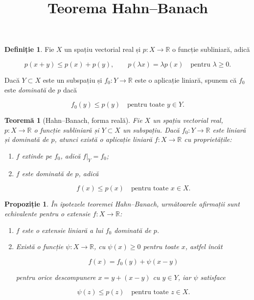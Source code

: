 \documentclass[12pt]{article}
\title{Teorema Hahn--Banach}
\author{}
\date{}
\theoremstyle{definition}
\newtheorem{definition}{Definiție}
\theoremstyle{plain}
\newtheorem{proposition}{Propoziție}
\newtheorem{theorem}{Teoremă}
\begin{document}
\maketitle

\begin{definition}
Fie $X$ un spațiu vectorial real și $p : X \to \mathbb{R}$ o funcție subliniară, adică


\[
p(x+y) \le p(x) + p(y), \qquad p(\lambda x) = \lambda p(x) \quad \text{pentru } \lambda \ge 0.
\]


Dacă $Y \subset X$ este un subspațiu și $f_0 : Y \to \mathbb{R}$ este o aplicație liniară, spunem că $f_0$ este \emph{dominată} de $p$ dacă


\[
f_0(y) \le p(y) \quad \text{pentru toate } y \in Y.
\]


\end{definition}

\begin{theorem}[Hahn--Banach, forma reală]
Fie $X$ un spațiu vectorial real, $p : X \to \mathbb{R}$ o funcție subliniară și $Y \subset X$ un subspațiu. Dacă $f_0 : Y \to \mathbb{R}$ este liniară și dominată de $p$, atunci există o aplicație liniară $f : X \to \mathbb{R}$ cu proprietățile:
\begin{enumerate}
    \item[(i)] $f$ extinde pe $f_0$, adică $f|_Y = f_0$;
    \item[(ii)] $f$ este dominată de $p$, adică
    

\[
    f(x) \le p(x) \quad \text{pentru toate } x \in X.
    \]


\end{enumerate}
\end{theorem}

\begin{proposition}
În ipotezele teoremei Hahn--Banach, următoarele afirmații sunt echivalente pentru o extensie $f : X \to \mathbb{R}$:
\begin{enumerate}
    \item[(i)] $f$ este o extensie liniară a lui $f_0$ dominată de $p$.
    \item[(ii)] Există o funcție $\psi : X \to \mathbb{R}$, cu $\psi(x) \ge 0$ pentru toate $x$, astfel încât
    

\[
    f(x) = f_0(y) + \psi(x-y)
    \]


    pentru orice descompunere $x = y + (x-y)$ cu $y \in Y$, iar $\psi$ satisface
    

\[
    \psi(z) \le p(z) \quad \text{pentru toate } z \in X.
    \]


\end{enumerate}
\end{proposition}
\end{document}
